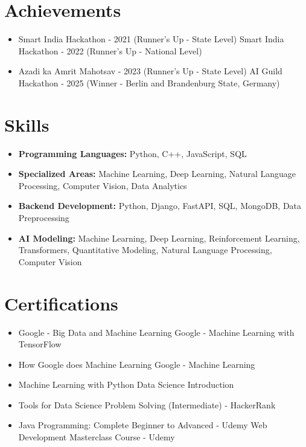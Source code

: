 \documentclass[a4paper,10pt]{article}
\begin{document}
\section*{Achievements}
\begin{itemize}
\item Smart India Hackathon - 2021 (Runner's Up - State Level) \hfill Smart India Hackathon - 2022 (Runner's Up - National Level)
\item Azadi ka Amrit Mahotsav - 2023 (Runner's Up - State Level) \hfill AI Guild Hackathon - 2025 (Winner - Berlin and Brandenburg State, Germany)
\end{itemize}

\section*{Skills}
\begin{itemize}
  \item \textbf{Programming Languages:} Python, C++, JavaScript, SQL
  \item \textbf{Specialized Areas:} Machine Learning, Deep Learning, Natural Language Processing, Computer Vision, Data Analytics
  \item \textbf{Backend Development:} Python, Django, FastAPI, SQL, MongoDB, Data Preprocessing
  \item \textbf{AI Modeling:} Machine Learning, Deep Learning, Reinforcement Learning, Transformers, Quantitative Modeling, Natural Language Processing, Computer Vision
\end{itemize}

\section*{Certifications}
\begin{itemize}
\item Google - Big Data and Machine Learning \hfill Google - Machine Learning with TensorFlow
\item How Google does Machine Learning \hfill Google - Machine Learning
\item Machine Learning with Python \hfill Data Science Introduction
\item Tools for Data Science \hfill Problem Solving (Intermediate) - HackerRank
\item Java Programming: Complete Beginner to Advanced - Udemy \hfill Web Development Masterclass Course - Udemy
\end{itemize}
\end{document}
